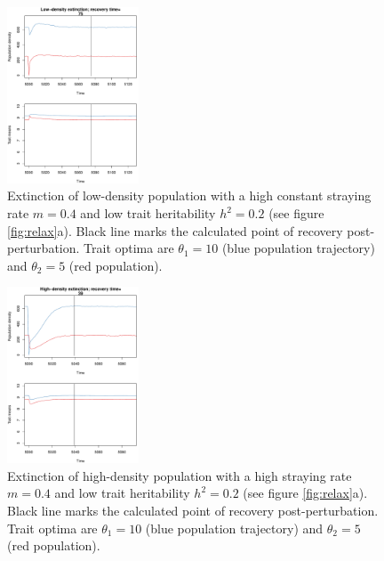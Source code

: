 \documentclass[twocolumn,preprintnumbers,amsmath,amssymb,superscriptaddress]{revtex4}
\newcommand{\beginsupplement}{%
        \clearpage
        \setcounter{table}{0}
        \renewcommand{\thetable}{S\arabic{table}}%
        \setcounter{figure}{0}
        \renewcommand{\thefigure}{S\arabic{figure}}%
     }
\begin{document}










\beginsupplement


\begin{figure}
  \captionsetup{justification=raggedright,
singlelinecheck=false
}
\centering
\includegraphics[width=0.35\textwidth]{figs2/fig_relax_small.pdf}
\caption{
Extinction of low-density population with a high constant straying rate $m=0.4$ and low trait heritability $h^2=0.2$ (see figure \ref{fig:relax}a).
Black line marks the calculated point of recovery post-perturbation.
Trait optima are $\theta_1 = 10$ (blue population trajectory) and $\theta_2 = 5$ (red population).
} \label{fig:relaxtraj_ldlh}
\end{figure}

\begin{figure}
  \captionsetup{justification=raggedright,
singlelinecheck=false
}
\centering
\includegraphics[width=0.35\textwidth]{figs2/fig_relax_large.pdf}
\caption{
Extinction of high-density population with a high straying rate $m=0.4$ and low trait heritability $h^2=0.2$ (see figure \ref{fig:relax}a).
Black line marks the calculated point of recovery post-perturbation.
Trait optima are $\theta_1 = 10$ (blue population trajectory) and $\theta_2 = 5$ (red population).
} \label{fig:relaxtraj_hdlh}
\end{figure}
\end{document}
